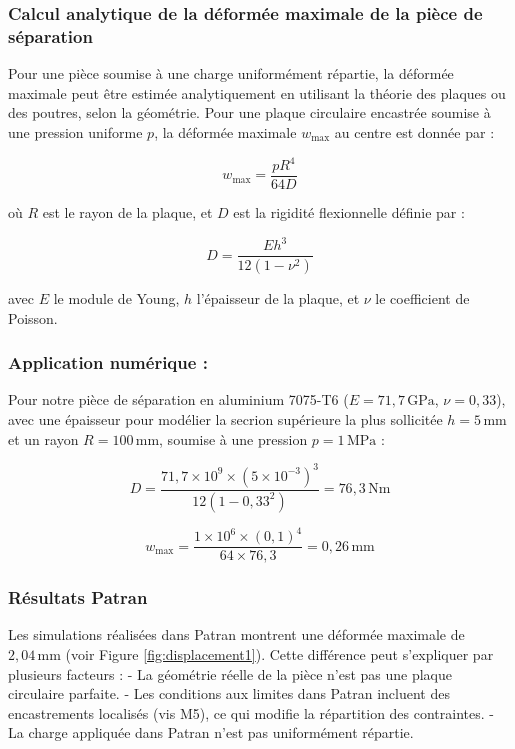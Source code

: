 \subsubsection{Calcul analytique de la déformée maximale de la pièce de séparation}

Pour une pièce soumise à une charge uniformément répartie, la déformée maximale peut être estimée analytiquement en utilisant la théorie des plaques ou des poutres, selon la géométrie. Pour une plaque circulaire encastrée soumise à une pression uniforme \(p\), la déformée maximale \(w_{\text{max}}\) au centre est donnée par :

\[
w_{\text{max}} = \frac{p R^4}{64 D}
\]

où \(R\) est le rayon de la plaque, et \(D\) est la rigidité flexionnelle définie par :

\[
D = \frac{E h^3}{12(1 - \nu^2)}
\]

avec \(E\) le module de Young, \(h\) l'épaisseur de la plaque, et \(\nu\) le coefficient de Poisson.

\subsubsection*{Application numérique :}
Pour notre pièce de séparation en aluminium 7075-T6 (\(E = 71,7 \, \text{GPa}\), \(\nu = 0,33\)), avec une épaisseur pour modélier la secrion supérieure la plus sollicitée \(h = 5 \, \text{mm}\) et un rayon \(R = 100 \, \text{mm}\), soumise à une pression \(p = 1 \, \text{MPa}\) :

\[
D = \frac{71,7 \times 10^9 \times (5 \times 10^{-3})^3}{12(1 - 0,33^2)} = 76,3 \, \text{Nm}
\]

\[
w_{\text{max}} = \frac{1 \times 10^6 \times (0,1)^4}{64 \times 76,3} = 0,26 \, \text{mm}
\]

\subsubsection{Résultats Patran}

Les simulations réalisées dans Patran montrent une déformée maximale de \(2,04 \, \text{mm}\) (voir Figure \ref{fig:displacement1}). Cette différence peut s'expliquer par plusieurs facteurs :
- La géométrie réelle de la pièce n'est pas une plaque circulaire parfaite.
- Les conditions aux limites dans Patran incluent des encastrements localisés (vis M5), ce qui modifie la répartition des contraintes.
- La charge appliquée dans Patran n'est pas uniformément répartie.

